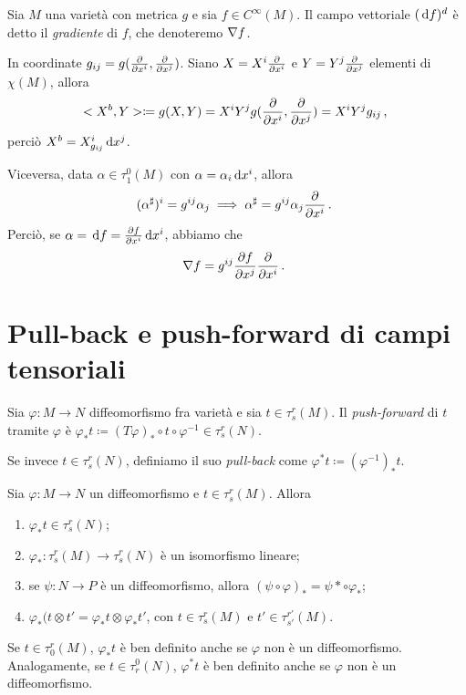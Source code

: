\begin{definition}
	Sia $M$ una varietà con metrica $g$ e sia $f \in C^\infty(M)$. Il campo vettoriale $(\,\mathrm d f)^d$ è detto il \emph{gradiente} di $f$, che denoteremo $\nabla f$. %
\end{definition}

In coordinate $g_{ij} = g(\frac{\partial }{\partial x^i}, \frac{\partial }{\partial x^j})$. Siano $X = X^i\frac{\partial }{\partial x^i}$ e $Y = Y^j\frac{\partial }{\partial x^j}$ elementi di $\chi(M)$, allora
\begin{equation*}
	<X^b, Y> \coloneqq g(X,Y) = X^iY^j g(\frac{\partial }{\partial x^i}, \frac{\partial }{\partial x^j}) = X^iY^j g_{ij} \, \text{, }
\end{equation*}
perciò $X^b = X_{g_{ij}}^i \,\mathrm d x^j$.

Viceversa, data $\alpha \in \tau_1^0(M)$ con $\alpha = \alpha_i\,\mathrm d x^i$, allora
\begin{equation*}
	(\alpha^\sharp)^i = g^{ij} \alpha_j \implies \alpha^\sharp = g^{ij} \alpha_j\frac{\partial }{\partial x^i} \, \text{. }
\end{equation*}
Perciò, se $\alpha = \,\mathrm d f = \frac{\partial f}{\partial x^i}\,\mathrm d x^i$, abbiamo che
\begin{equation*}
	\nabla f = g^{ij} \frac{\partial f}{\partial x^j} \frac{\partial }{\partial x^i} \, \text{. }
\end{equation*}


\section{Pull-back e push-forward di campi tensoriali}

\begin{definition}
	Sia $\varphi : M \to N$ diffeomorfismo fra varietà e sia $t \in \tau_s^r(M)$. Il \emph{push-forward} di $t$ tramite $\varphi$ è $\varphi_*t \coloneqq (T\varphi)_* \circ t \circ \varphi^{-1} \in \tau_s^r(N)$.
	
	Se invece $t \in \tau_s^r(N)$, definiamo il suo \emph{pull-back} come $\varphi^*t \coloneqq (\varphi^{-1})_* t$.
\end{definition}

\begin{proposition}
	Sia $\varphi: M \to N$ un diffeomorfismo e $t\in \tau_s^r(M)$. Allora
	\begin{enumerate}
		\item $\varphi_*t \in \tau_s^r(N)$;
		\item $\varphi_* : \tau_s^r(M) \to \tau_s^r(N)$ è un isomorfismo lineare;
		\item se $\psi: N \to P$ è un diffeomorfismo, allora $(\psi\circ \varphi)_* = \psi* \circ \varphi_*$;
		\item $\varphi_*(t\otimes t' = \varphi_* t\otimes \varphi_* t'$, con $t\in \tau_s^r(M)$ e $t'\in \tau_{s'}^{r'}(M)$.
	\end{enumerate}
\end{proposition}

\begin{remark}
	Se $t\in\tau_0^r(M)$, $\varphi_*t$ è ben definito anche se $\varphi$ non è un diffeomorfismo. Analogamente, se $t \in \tau_r^0(N)$, $\varphi^*t$ è ben definito anche se $\varphi$ non è un diffeomorfismo.
\end{remark}















